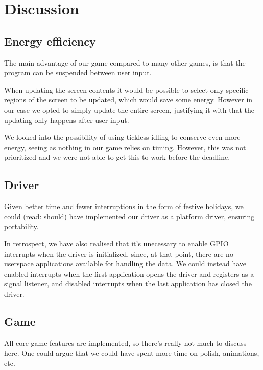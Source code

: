 \section{Discussion}

\subsection{Energy efficiency}
The main advantage of our game compared to many other games, is that the program can be suspended between user input.

When updating the screen contents it would be possible to select only specific regions of the screen to be updated, which would save some energy.
However in our case we opted to simply update the entire screen, justifying it with that the updating only happens after user input.

We looked into the possibility of using tickless idling to conserve even more energy,
seeing as nothing in our game relies on timing.
However, this was not prioritized and we were not able to get this to work before the deadline.

\subsection{Driver}
Given better time and fewer interruptions in the form of festive holidays, we could (read: should) have implemented our driver as a platform driver, ensuring portability.

In retrospect, we have also realised that it's unecessary to enable GPIO interrupts when the driver is initialized, since, at that point, there are no userspace applications available for handling the data. We could instead have enabled interrupts when the first application opens the driver and registers as a signal listener, and disabled interrupts when the last application has closed the driver.

\subsection{Game}

All core game features are implemented, so there's really not much to discuss here. One could argue that we could have spent more time on polish, animations, etc.
